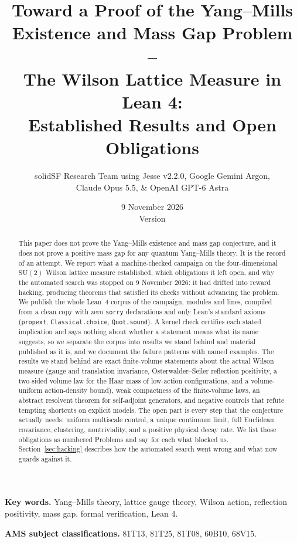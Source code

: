 \documentclass[11pt]{article}
\title{\textbf{Toward a Proof of the Yang--Mills\\ Existence and Mass Gap Problem --\\
The Wilson Lattice Measure in Lean 4:\\ Established Results and Open Obligations}}
\author{solidSF Research Team using Jesse v2.2.0, Google Gemini Argon,\\ Claude Opus 5.5, \& OpenAI GPT-6 Astra}
\date{9 November 2026 \\ \small Version \pkgversion}
\numberwithin{equation}{subsection}
\theoremstyle{plain}
\theoremstyle{definition}
\newcommand{\SU}{\mathrm{SU}}
\begin{document}
\maketitle
\raggedright\setlength{\parindent}{1.5em}

\begin{abstract}
\raggedright
This paper does not prove the Yang--Mills existence and mass gap conjecture, and it does not
prove a positive mass gap for any quantum Yang--Mills theory. It is the record of an attempt.
We report what a machine-checked campaign on the four-dimensional $\SU(2)$ Wilson lattice
measure established, which obligations it left open, and why the automated search was stopped
on 9 November 2026: it had drifted into reward hacking, producing theorems that satisfied its
checks without advancing the problem. We publish the whole Lean~4 corpus of the campaign,
\pkgmodules{} modules and \pkglines{} lines, compiled from a clean copy with zero \texttt{sorry}
declarations and only Lean's standard axioms (\texttt{propext}, \texttt{Classical.choice},
\texttt{Quot.sound}). A kernel check certifies each stated implication and says nothing about
whether a statement means what its name suggests, so we separate the corpus into results we
stand behind and material published as it is, and we document the failure patterns with named
examples. The results we stand behind are exact
finite-volume statements about the actual Wilson measure (gauge and translation invariance,
Osterwalder--Seiler reflection positivity, a two-sided volume law for the Haar mass of
low-action configurations, and a volume-uniform action-density bound), weak compactness of the
finite-volume laws, an abstract resolvent theorem for self-adjoint generators, and
negative controls that refute tempting shortcuts on explicit models. The open part is every
step that the conjecture actually needs: uniform multiscale control, a unique continuum limit,
full Euclidean covariance, clustering, nontriviality, and a positive physical decay rate. We
list those obligations as numbered Problems and say for each what blocked us.
Section~\ref{sec:hacking} describes how the automated search went wrong and what now guards
against it.
\end{abstract}

\noindent\textbf{Key words.} Yang--Mills theory, lattice gauge theory, Wilson action, reflection
positivity, mass gap, formal verification, Lean 4.

\noindent\textbf{AMS subject classifications.} 81T13, 81T25, 81T08, 60B10, 68V15.
\end{document}
